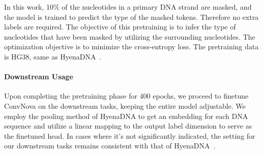 In this work, 10\% of the nucleotides in a primary DNA strand are masked, and the model is trained to predict the type of the masked tokens. Therefore no extra labels are required. The objective of this pretraining is to infer the type of nucleotides that have been masked by utilizing the surrounding nucleotides. The optimization objective is to minimize the cross-entropy loss. The pretraining data is HG38, same as HyenaDNA~\citep{nguyen2024hyenadna}.

\paragraph{Downstream Usage}
Upon completing the pretraining phase for 400 epochs, we proceed to finetune ConvNova on the downstream tasks, keeping the entire model adjustable. We employ the pooling method of HyenaDNA to get an embedding for each DNA sequence and utilize a linear mapping to the output label dimension to serve as the finetuned head. In cases where it's not significantly indicated, the setting for our downstream tasks remains consistent with that of HyenaDNA~\citep{nguyen2024hyenadna}.

